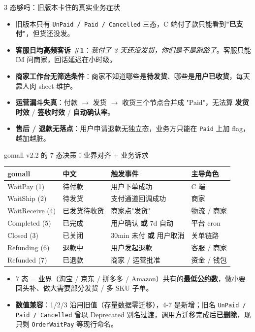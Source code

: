 \documentclass[aspectratio=169,11pt]{beamer}
\begin{document}
\begin{frame}[shrink]{3 态够吗：旧版本卡住的真实业务症状}
\begin{itemize}
  \item 旧版本只有 \texttt{UnPaid / Paid / Cancelled} 三态，C 端付了款只能看到\textbf{"已支付"}，但货还没发。
  \item \textbf{客服日均高频客诉 \#1}：\textit{我付了 3 天还没发货，你们是不是跑路了}。客服只能 IM 问商家，回话延迟在小时级。
  \item \textbf{商家工作台无筛选条件}：商家不知道哪些是\textbf{待发货}、哪些是\textbf{用户已收货}，每天靠人肉 sheet 维护。
  \item \textbf{运营漏斗失真}：付款 $\to$ 发货 $\to$ 收货三个节点合并成 "Paid"，无法算 \textbf{发货时效} / \textbf{签收时效} / \textbf{自动确认率}。
  \item \textbf{售后 / 退款无落点}：用户申请退款无独立态，业务方只能在 \texttt{Paid} 上加 flag，越加越脏。
\end{itemize}
\end{frame}

\begin{frame}[shrink]{gomall v2.2 的 7 态决策：业界对齐 + 业务诉求}
{\small
\begin{tabular}{@{}llll@{}}
\toprule
gomall & 中文 & 触发事件 & 主导角色 \\
\midrule
WaitPay (1)     & 待付款       & 用户下单成功                     & C 端 \\
WaitShip (2)    & 待发货       & 支付通道回调成功                 & 商家 \\
WaitReceive (4) & 已发货待收货 & 商家点"发货"                    & 物流 / 商家 \\
Completed (5)   & 已完成       & 用户确认 \textbf{或} 7d 自动     & 平台 cron \\
Closed (3)      & 已关闭       & 30min 未付 \textbf{或} 用户取消  & 关单链路 \\
Refunding (6)   & 退款中       & 用户发起退款                     & 客服 / 商家 \\
Refunded (7)    & 已退款       & 商家 / 运营批准                  & 资金 / 钱包 \\
\bottomrule
\end{tabular}}
\vspace{2mm}
\begin{itemize}
  \item 7 态 = 业界（淘宝 / 京东 / 拼多多 / Amazon）共有的\textbf{最低公约数}，做小要回头补、做大需要部分发货 / 多 SKU 子单。
  \item \textbf{数值兼容}：1/2/3 沿用旧值（存量数据零迁移），4-7 是新增；旧名 \texttt{UnPaid / Paid / Cancelled} 曾以 Deprecated 别名过渡，调用方迁移完成后\textbf{已删除}，现只剩 \texttt{OrderWaitPay} 等现行命名。
\end{itemize}
\end{frame}
\end{document}
